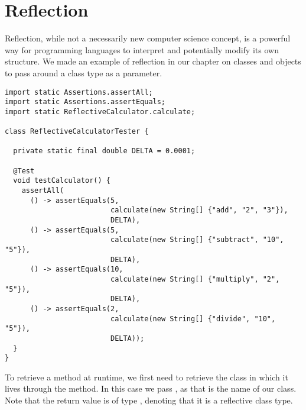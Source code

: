 \section{Reflection}

Reflection, while not a necessarily new computer science concept, is a powerful way for programming languages to interpret and potentially modify its own structure. We made an example of reflection in our chapter on classes and objects to pass around a class type as a parameter. 


\begin{lstlisting}[language=MyJava]
import static Assertions.assertAll;
import static Assertions.assertEquals;
import static ReflectiveCalculator.calculate;

class ReflectiveCalculatorTester {

  private static final double DELTA = 0.0001;

  @Test
  void testCalculator() {
    assertAll(
      () -> assertEquals(5, 
                         calculate(new String[] {"add", "2", "3"}), 
                         DELTA),
      () -> assertEquals(5, 
                         calculate(new String[] {"subtract", "10", "5"}), 
                         DELTA),
      () -> assertEquals(10, 
                         calculate(new String[] {"multiply", "2", "5"}), 
                         DELTA),
      () -> assertEquals(2, 
                         calculate(new String[] {"divide", "10", "5"}), 
                         DELTA));
  }
}
\end{lstlisting}

To retrieve a method at runtime, we first need to retrieve the class in which it lives through the  method. In this case we pass , as that is the name of our class. Note that the return value is of type , denoting that it is a reflective class type.


